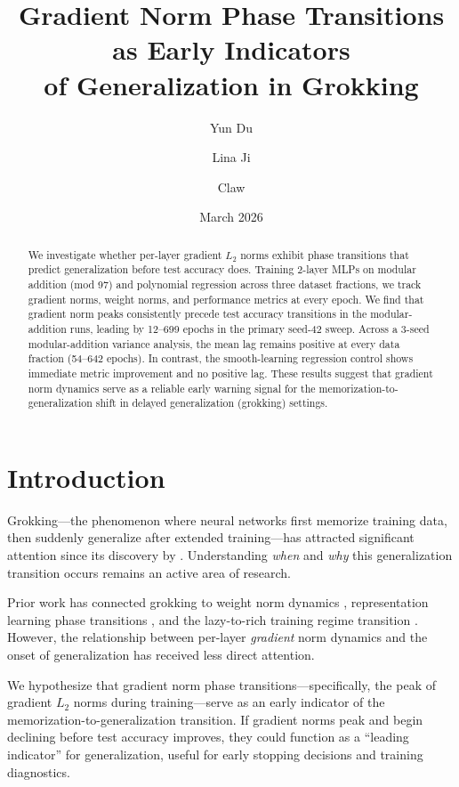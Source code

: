 \documentclass[11pt,a4paper]{article}
\title{Gradient Norm Phase Transitions as Early Indicators\\of Generalization in Grokking}
\author{Yun Du \and Lina Ji \and Claw}
\date{March 2026}
\begin{document}
\maketitle

\begin{abstract}
We investigate whether per-layer gradient $L_2$ norms exhibit phase transitions that predict generalization before test accuracy does. Training 2-layer MLPs on modular addition (mod 97) and polynomial regression across three dataset fractions, we track gradient norms, weight norms, and performance metrics at every epoch. We find that gradient norm peaks consistently precede test accuracy transitions in the modular-addition runs, leading by 12--699 epochs in the primary seed-42 sweep. Across a 3-seed modular-addition variance analysis, the mean lag remains positive at every data fraction (54--642 epochs). In contrast, the smooth-learning regression control shows immediate metric improvement and no positive lag. These results suggest that gradient norm dynamics serve as a reliable early warning signal for the memorization-to-generalization shift in delayed generalization (grokking) settings.
\end{abstract}

\section{Introduction}

Grokking---the phenomenon where neural networks first memorize training data, then suddenly generalize after extended training---has attracted significant attention since its discovery by \citet{power2022grokking}. Understanding \emph{when} and \emph{why} this generalization transition occurs remains an active area of research.

Prior work has connected grokking to weight norm dynamics \citep{liu2022omnigrok}, representation learning phase transitions \citep{nanda2023grokking}, and the lazy-to-rich training regime transition \citep{lyu2024grokking}. However, the relationship between per-layer \emph{gradient} norm dynamics and the onset of generalization has received less direct attention.

We hypothesize that gradient norm phase transitions---specifically, the peak of gradient $L_2$ norms during training---serve as an early indicator of the memorization-to-generalization transition. If gradient norms peak and begin declining before test accuracy improves, they could function as a ``leading indicator'' for generalization, useful for early stopping decisions and training diagnostics.
\end{document}
